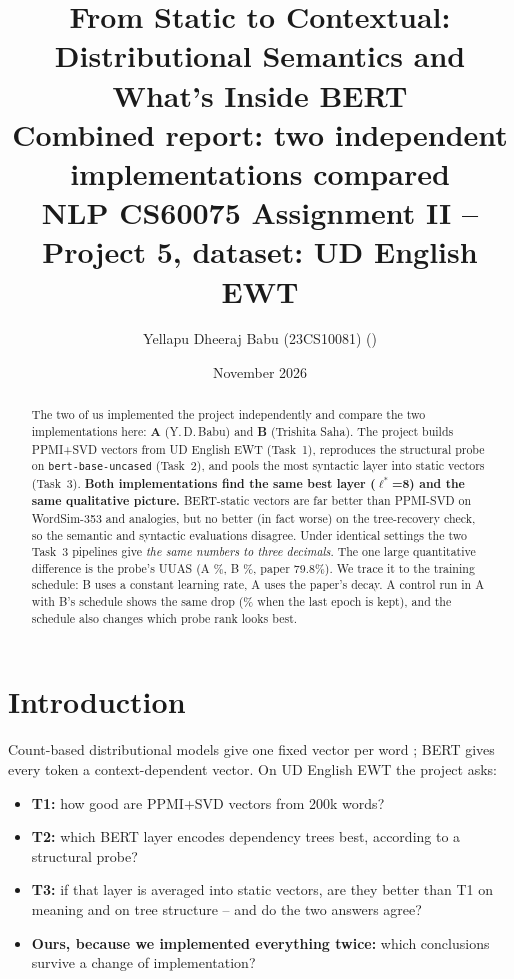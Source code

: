 \documentclass[11pt,a4paper]{article}
\title{\vspace{-1.2cm}\textbf{From Static to Contextual: Distributional Semantics and What's Inside BERT}\\[2pt]
\large Combined report: two independent implementations compared\\[1pt]
\normalsize NLP CS60075 Assignment II -- Project 5, dataset: UD English EWT}
\author{Yellapu Dheeraj Babu (23CS10081) \qquad \TeammateName{} (\TeammateRoll)}
\date{November 2026}
\newcommand{\lstar}{\ensuremath{\ell^*}}
\newcommand{\TeammateName}{Trishita Saha}
\begin{document}
\maketitle
\vspace{-0.6cm}
\begin{abstract}
\noindent The two of us implemented the project independently and compare the two implementations here: \textbf{A}
(Y.\,D.\,Babu) and \textbf{B} (\TeammateName). The project builds PPMI+SVD vectors from UD English EWT (Task~1), reproduces the
\citet{hewitt} structural probe on \texttt{bert-base-uncased} (Task~2), and pools the most syntactic layer into static vectors
(Task~3). \textbf{Both implementations find the same best layer (\lstar=8) and the same qualitative picture.} BERT-static vectors are far
better than PPMI-SVD on WordSim-353 and analogies, but no better (in fact worse) on the tree-recovery check, so the semantic and
syntactic evaluations disagree. Under identical settings the two Task~3 pipelines give \emph{the same numbers to three decimals}.
The one large quantitative difference is the probe's UUAS (A \TtwoTestUuas\%, B \BUUASnp\%, paper 79.8\%). We trace it to the training
schedule: B uses a constant learning rate, A uses the paper's decay. A control run in A with B's schedule shows the same drop (\ALitUUASonetwoeight\% when the last epoch is kept), and
the schedule also changes which probe rank looks best.
\end{abstract}

\section{Introduction}
Count-based distributional models give one fixed vector per word \citep{levy2014}; BERT \citep{devlin} gives every token a
context-dependent vector. On UD English EWT \citep{silveira,ud} the project asks:
\begin{itemize}
\item \textbf{T1:} how good are PPMI+SVD vectors from 200k words?
\item \textbf{T2:} which BERT layer encodes dependency trees best, according to a structural probe?
\item \textbf{T3:} if that layer is averaged into static vectors, are they better than T1 on meaning and on tree structure -- and do
the two answers agree?
\item \textbf{Ours, because we implemented everything twice:} which conclusions survive a change of implementation?
\end{itemize}
\end{document}
